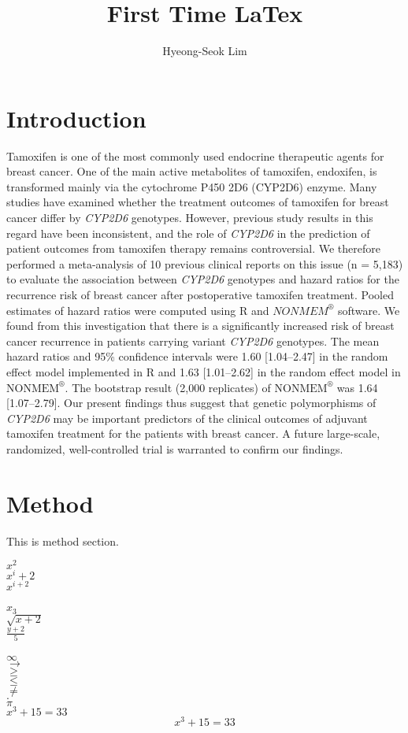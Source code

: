 \documentclass[titlepage]{article}
\title{First Time LaTex}
\author{Hyeong-Seok Lim}
\begin{document}
\maketitle
\tableofcontents


\newpage

\section{Introduction}

Tamoxifen is one of the most commonly used endocrine therapeutic agents for breast cancer. One of the main active metabolites of tamoxifen, endoxifen, is transformed mainly via the cytochrome P450 2D6 (CYP2D6) enzyme. Many studies have examined whether the treatment outcomes of tamoxifen for breast cancer differ by \textit{CYP2D6} genotypes. However, previous study results in this regard have been inconsistent, and the role of \textit{CYP2D6} in the prediction of patient outcomes from tamoxifen therapy remains controversial. We therefore performed a meta-analysis of 10 previous clinical reports on this issue (n = 5,183) to evaluate the association between \textit{CYP2D6} genotypes and hazard ratios for the recurrence risk of breast cancer after postoperative tamoxifen treatment. Pooled estimates of hazard ratios were computed using R and $NONMEM^®$ software. We found from this investigation that there is a significantly increased risk of breast cancer recurrence in patients carrying variant \textit{CYP2D6} genotypes. The mean hazard ratios and 95\% confidence intervals were 1.60 [1.04–2.47] in the random effect model implemented in R and 1.63 [1.01–2.62] in the random effect model in $\textrm{NONMEM}^®$. The bootstrap result (2,000 replicates) of $\textrm{NONMEM}^®$ was 1.64 [1.07–2.79]. Our present findings thus suggest that genetic polymorphisms of \textit{CYP2D6} may be important predictors of the clinical outcomes of adjuvant tamoxifen treatment for the patients with breast cancer. A future large-scale, randomized, well-controlled trial is warranted to confirm our findings.

\newpage

\section{Method}
\label{sec:method}

This is method section.


$x^2$\\
$x^i+2$\\
$x^{i+2}$\\
\\
$x_3$\\
$\sqrt{x+2}$\\
$\frac{y+2}{5}$\\
\\
$\infty$\\
$\to$\\
$\geq$\\
$\leq$\\
$\neq$\\
$\cdot$\\
$\pi$\\
$x^3+15=33$
\[x^3+15=33\]
\end{document}
